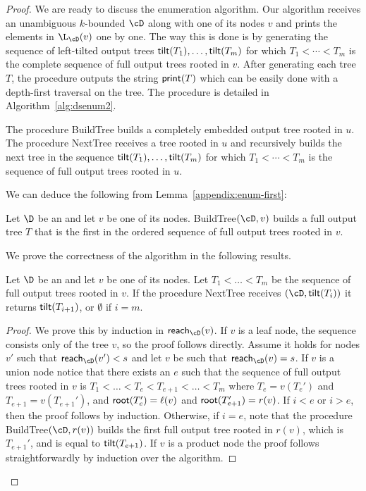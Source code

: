 \begin{proof}
	
	We are ready to discuss the enumeration algorithm. Our algorithm receives an unambiguous $k$-bounded \dsabbr $\cD$ along with one of its nodes $v$ and prints the elements in $\L_{\cD}(v)$ one by one. The way this is done is by generating the sequence of left-tilted output trees ${\sf tilt}(T_1),\ldots,{\sf tilt}(T_m)$ for which $T_1 < \cdots < T_m$ is the complete sequence of full output trees rooted in $v$. After generating each tree $T$, the procedure outputs the string ${\sf print}(T)$ which can be easily done with a depth-first traversal on the tree. The procedure is detailed in Algorithm~\ref{alg:dsenum2}.
	
	The procedure {\sc BuildTree} builds a completely embedded output tree rooted in $u$. The procedure {\sc NextTree} receives a tree rooted in $u$ and recursively builds the next tree in the sequence ${\sf tilt}(T_1),\ldots,{\sf tilt}(T_m)$ for which $T_1 < \cdots < T_m$ is the sequence of full output trees rooted in $u$. 
	
	We can deduce the following from Lemma~\ref{appendix:enum-first}:
	\begin{corollary}
		Let $\D$ be an \dsabbr and let $v$ be one of its nodes. {\sc BuildTree}$(\cD,v)$ builds a full output tree $T$ that is the first in the ordered sequence of full output trees rooted in $v$.
	\end{corollary}
	
	We prove the correctness of the algorithm in the following results.
	
	\begin{lemma}\label{appendix:enum-correctlemma}
		Let $\D$ be an \dsabbr and let $v$ be one of its nodes. Let $T_1<\ldots<T_m$ be the sequence of full output trees rooted in $v$. If the procedure {\sc NextTree} receives $(\cD,{\sf tilt}(T_i))$ it returns ${\sf tilt}(T_{i+1})$, or $\emptyset$ if $i = m$.
	\end{lemma}
	\begin{proof}
		We prove this by induction in ${\sf reach}_{\cD}(v)$. If $v$ is a leaf node, the sequence consists only of the tree $v$, so the proof follows directly. 
		Assume it holds for nodes $v'$ such that ${\sf reach}_{\cD}(v') < s$ and let $v$ be such that ${\sf reach}_{\cD}(v) = s$. 
		If $v$ is a union node notice that there exists an $e$ such that the sequence of full output trees rooted in $v$ is $T_1<\ldots<T_e<T_{e+1}<\ldots<T_m$ where $T_e = v(T_e')$ and $T_{e+1} = v(T_{e+1}')$, and ${\sf root}(T_e') = \ell(v)$ and ${\sf root}(T_{e+1}') = r(v)$. 
		If $i < e$ or $i > e$, then the proof follows by induction. Otherwise, if $i = e$, note that the procedure {\sc BuildTree}$(\cD,r(v))$ builds the first full output tree rooted in $r(v)$, which is $T_{e+1}'$, and is equal to ${\sf tilt}(T_{e+1})$. 
		If $v$ is a product node the proof follows straightforwardly by induction over the algorithm.
	\end{proof}
	

\end{proof}

